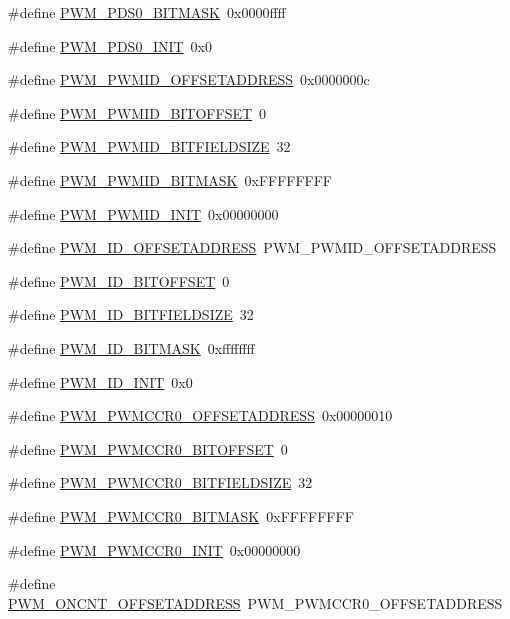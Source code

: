 \begin{DoxyCompactItemize}
\item 
\#define \hyperlink{a00565_a60c76844001c700b5dfa3162b04d7b9d}{PWM\_\-PDS0\_\-BITMASK}~0x0000ffff
\item 
\#define \hyperlink{a00565_ac9074da35e87234a5ea38426c9018ec4}{PWM\_\-PDS0\_\-INIT}~0x0
\item 
\#define \hyperlink{a00565_ac7cf84caf366abf45c8bea875af9d9cd}{PWM\_\-PWMID\_\-OFFSETADDRESS}~0x0000000c
\item 
\#define \hyperlink{a00565_ab16f58c2ba3dd62d1cb62c7bc545ef17}{PWM\_\-PWMID\_\-BITOFFSET}~0
\item 
\#define \hyperlink{a00565_a890c82cbcf55f493d7b1e7ea19bfe54a}{PWM\_\-PWMID\_\-BITFIELDSIZE}~32
\item 
\#define \hyperlink{a00565_ab10df0efef0c94288e260ab197d40a5b}{PWM\_\-PWMID\_\-BITMASK}~0xFFFFFFFF
\item 
\#define \hyperlink{a00565_a80e2697233e8ec4bc934b91d8f19e31f}{PWM\_\-PWMID\_\-INIT}~0x00000000
\item 
\#define \hyperlink{a00565_a633098a5cae368212040cfe0f285a2e0}{PWM\_\-ID\_\-OFFSETADDRESS}~PWM\_\-PWMID\_\-OFFSETADDRESS
\item 
\#define \hyperlink{a00565_a980cbc74448c168119540aa7e63b2314}{PWM\_\-ID\_\-BITOFFSET}~0
\item 
\#define \hyperlink{a00565_a2eb8bd2ff17c539025823cbe71616f89}{PWM\_\-ID\_\-BITFIELDSIZE}~32
\item 
\#define \hyperlink{a00565_a69479612854fb302d76c4ee1c308095c}{PWM\_\-ID\_\-BITMASK}~0xffffffff
\item 
\#define \hyperlink{a00565_a0b1a1bbe9036e85057cf408ef7327bb8}{PWM\_\-ID\_\-INIT}~0x0
\item 
\#define \hyperlink{a00565_a96c4b7a9710e59bc16e7a9080c65d993}{PWM\_\-PWMCCR0\_\-OFFSETADDRESS}~0x00000010
\item 
\#define \hyperlink{a00565_a3938e138ff2db3e10edfeaa93942082d}{PWM\_\-PWMCCR0\_\-BITOFFSET}~0
\item 
\#define \hyperlink{a00565_aee0a6aa8798a5a77567630bc95da6238}{PWM\_\-PWMCCR0\_\-BITFIELDSIZE}~32
\item 
\#define \hyperlink{a00565_a84d2c5ab073744cc88a2cd5ec7ad9da8}{PWM\_\-PWMCCR0\_\-BITMASK}~0xFFFFFFFF
\item 
\#define \hyperlink{a00565_a65a30122017f33352742e6c4bd27a61c}{PWM\_\-PWMCCR0\_\-INIT}~0x00000000
\item 
\#define \hyperlink{a00565_a81d3568a6a82e43d3ce81c82d7bf9722}{PWM\_\-ONCNT\_\-OFFSETADDRESS}~PWM\_\-PWMCCR0\_\-OFFSETADDRESS

\end{DoxyCompactItemize}

